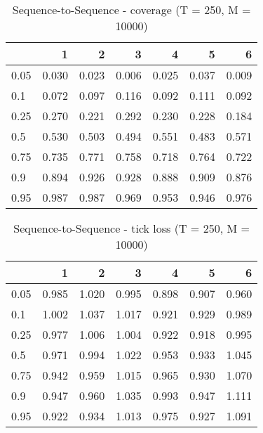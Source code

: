 \documentclass{article}
\begin{document}
\begin{table}[h!]
\centering
\caption{Sequence-to-Sequence - coverage (T = 250, M = 10000)}
\label{tab: Sequence-to-Sequence cov}
\begin{tabular}{lrrrrrr}
\toprule
 & 1 & 2 & 3 & 4 & 5 & 6 \\
\midrule
0.05 & 0.030 & 0.023 & 0.006 & 0.025 & 0.037 & 0.009 \\
0.1 & 0.072 & 0.097 & 0.116 & 0.092 & 0.111 & 0.092 \\
0.25 & 0.270 & 0.221 & 0.292 & 0.230 & 0.228 & 0.184 \\
0.5 & 0.530 & 0.503 & 0.494 & 0.551 & 0.483 & 0.571 \\
0.75 & 0.735 & 0.771 & 0.758 & 0.718 & 0.764 & 0.722 \\
0.9 & 0.894 & 0.926 & 0.928 & 0.888 & 0.909 & 0.876 \\
0.95 & 0.987 & 0.987 & 0.969 & 0.953 & 0.946 & 0.976 \\
\bottomrule
\end{tabular}
\end{table}

\begin{table}[h!]
\centering
\caption{Sequence-to-Sequence - tick loss (T = 250, M = 10000)}
\label{tab: Sequence-to-Sequence tic}
\begin{tabular}{lrrrrrr}
\toprule
 & 1 & 2 & 3 & 4 & 5 & 6 \\
\midrule
0.05 & 0.985 & 1.020 & 0.995 & 0.898 & 0.907 & 0.960 \\
0.1 & 1.002 & 1.037 & 1.017 & 0.921 & 0.929 & 0.989 \\
0.25 & 0.977 & 1.006 & 1.004 & 0.922 & 0.918 & 0.995 \\
0.5 & 0.971 & 0.994 & 1.022 & 0.953 & 0.933 & 1.045 \\
0.75 & 0.942 & 0.959 & 1.015 & 0.965 & 0.930 & 1.070 \\
0.9 & 0.947 & 0.960 & 1.035 & 0.993 & 0.947 & 1.111 \\
0.95 & 0.922 & 0.934 & 1.013 & 0.975 & 0.927 & 1.091 \\
\bottomrule
\end{tabular}
\end{table}
\end{document}
